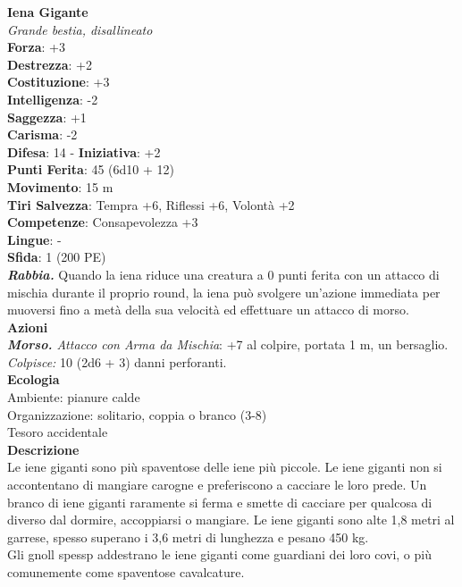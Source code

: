 \begin{multicols}{2}
\medskip\textbf{Iena Gigante}\\
\emph{Grande bestia, disallineato}\\
\textbf{Forza}: +3\\
\textbf{Destrezza}: +2\\
\textbf{Costituzione}: +3\\
\textbf{Intelligenza}: -2\\
\textbf{Saggezza}: +1\\
\textbf{Carisma}: -2\\
\textbf{Difesa}: 14 - \textbf{Iniziativa}: +2\\
\textbf{Punti Ferita}: 45 (6d10 + 12)\\
\textbf{Movimento}: 15 m\\
\textbf{Tiri Salvezza}: Tempra +6, Riflessi +6, Volontà +2 \\
\textbf{Competenze}: Consapevolezza +3\\
\textbf{Lingue}: -\\
\textbf{Sfida}: 1 (200 PE)\smallskip\\
\emph{\textbf{Rabbia.}} Quando la iena riduce una creatura a 0 punti ferita con un attacco di mischia durante il proprio round, la iena può svolgere un'azione immediata per muoversi fino a metà della sua velocità ed effettuare un attacco di morso.\\
\smallskip\textbf{Azioni}\\
\emph{\textbf{Morso.} Attacco con Arma da Mischia}: +7 al colpire, portata 1 m, un bersaglio.\\
\emph{Colpisce:} 10 (2d6 + 3) danni perforanti.\\
\textbf{Ecologia}\\
Ambiente: pianure calde\\
Organizzazione: solitario, coppia o branco (3-8)\\
Tesoro accidentale\\
\textbf{Descrizione}\\
Le iene giganti sono più spaventose delle iene più piccole. Le iene giganti non si accontentano di mangiare carogne e preferiscono a cacciare le loro prede. Un branco di  iene giganti raramente si ferma e smette di cacciare per qualcosa di diverso dal dormire, accoppiarsi o mangiare. Le iene giganti sono alte 1,8 metri al garrese, spesso superano i 3,6 metri di lunghezza e pesano 450 kg.\\

Gli gnoll spessp addestrano le iene giganti come guardiani dei loro covi, o più comunemente come spaventose cavalcature.\\



\end{multicols}
